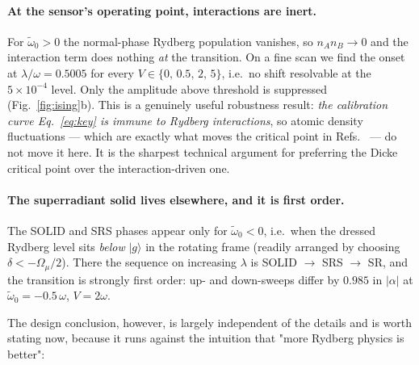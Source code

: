 \documentclass[11pt,a4paper]{article}
\newcommand{\Omu}{\Omega_{\mu}}
\newcommand{\wt}{\tilde{\omega}_{0}}
\newcommand{\ket}[1]{\lvert #1 \rangle}
\begin{document}
\paragraph{At the sensor's operating point, interactions are inert.} For $\wt>0$ the
normal-phase Rydberg population vanishes, so $n_A n_B \to 0$ and the interaction term does
nothing \emph{at} the transition. On a fine scan we find the onset at
$\lambda/\omega = 0.5005$ for every $V \in \{0,\,0.5,\,2,\,5\}$, i.e.\ no shift resolvable at
the $5\times10^{-4}$ level. Only the amplitude above threshold is suppressed
(Fig.~\ref{fig:ising}b). This is a genuinely useful robustness result: \emph{the calibration
curve Eq.~\eqref{eq:key} is immune to Rydberg interactions}, so atomic density fluctuations
--- which are exactly what moves the critical point in
Refs.~\cite{Ding2022,Wang2025} --- do not move it here. It is the sharpest technical argument
for preferring the Dicke critical point over the interaction-driven one.

\paragraph{The superradiant solid lives elsewhere, and it is first order.} The SOLID and SRS
phases appear only for $\wt<0$, i.e.\ when the dressed Rydberg level sits \emph{below}
$\ket{g}$ in the rotating frame (readily arranged by choosing $\delta<-\Omu/2$). There the
sequence on increasing $\lambda$ is SOLID $\to$ SRS $\to$ SR, and the transition is strongly
first order: up- and down-sweeps differ by $0.985$ in $|\alpha|$ at $\wt=-0.5\,\omega$,
$V=2\omega$.

The design conclusion, however, is largely independent of the details and is worth stating
now, because it runs against the intuition that "more Rydberg physics is better":
\end{document}
